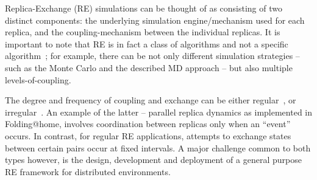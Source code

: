 \documentclass{rspublic}
\newcommand{\alnote}[1]{ {\textcolor{blue} { ***AL: #1 }}}
\newcommand{\jhanote}[1]{ {\textcolor{red} { ***SJ: #1 }}}
\newcommand{\alnote}[1]{}
\newcommand{\jhanote}[1]{}
\begin{document}

Replica-Exchange (RE) simulations can be thought of as consisting of
two distinct components: the underlying simulation engine/mechanism
used for each replica, and the coupling-mechanism between the
individual replicas.  It is important to note that RE is in fact a
class of algorithms and not a specific
algorithm~\cite{dpa-paper}; for example, there can be not only
different simulation strategies -- such as the Monte Carlo and the
described MD approach -- but also multiple levels-of-coupling.  


The degree and frequency of coupling and exchange can be either
regular~\cite{hansmann,Sugita:1999rm}, or
irregular~\cite{SPdynamics,pande_bj03}. An example of the latter --
parallel replica dynamics as implemented in Folding@home, involves
coordination between replicas only when an ``event'' occurs.  In
contrast, for regular RE applications, attempts to exchange states
between certain pairs occur at fixed intervals. A major challenge
common to both types however, is the design, development and
deployment of a general purpose RE framework for distributed
environments.

          
\end{document}
